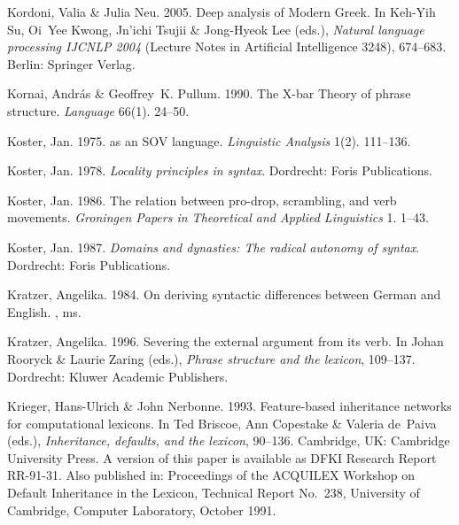 \begin{thebibliography}{1420}
Kordoni, Valia \& Julia Neu. 2005.
\newblock Deep analysis of {Modern Greek}.
\newblock In Keh-Yih Su, Oi~Yee Kwong, Jn'ichi Tsujii \& Jong-Hyeok Lee (eds.),
  \emph{Natural language processing {IJCNLP 2004}} (Lecture Notes in Artificial
  Intelligence 3248), 674--683. Berlin: Springer Verlag.

Kornai, Andr{\'a}s \& Geoffrey~K. Pullum. 1990.
\newblock The {X-bar Theory} of phrase structure.
\newblock \emph{Language} 66(1). 24--50.

Koster, Jan. 1975.
 as an {SOV} language.
\newblock \emph{Linguistic Analysis} 1(2). 111--136.

Koster, Jan. 1978.
\newblock \emph{Locality principles in syntax}.
\newblock Dordrecht: Foris Publications.

Koster, Jan. 1986.
\newblock The relation between pro-drop, scrambling, and verb movements.
\newblock \emph{Groningen Papers in Theoretical and Applied Linguistics} 1.
  1--43.

Koster, Jan. 1987.
\newblock \emph{Domains and dynasties: {The} radical autonomy of syntax}.
\newblock Dordrecht: Foris Publications.

Kratzer, Angelika. 1984.
\newblock On deriving syntactic differences between {German} and {English}.
, ms.

Kratzer, Angelika. 1996.
\newblock Severing the external argument from its verb.
\newblock In Johan Rooryck \& Laurie Zaring (eds.), \emph{Phrase structure and
  the lexicon}, 109--137. Dordrecht: Kluwer Academic Publishers.

Krieger, Hans-Ulrich \& John Nerbonne. 1993.
\newblock Feature-based inheritance networks for computational lexicons.
\newblock In Ted Briscoe, Ann Copestake \& Valeria de~Paiva (eds.),
  \emph{Inheritance, defaults, and the lexicon}, 90--136. Cambridge, UK:
  Cambridge University Press.
\newblock A version of this paper is available as DFKI Research Report
  RR-91-31. Also published in: {Proceedings} of the {ACQUILEX} Workshop on
  Default Inheritance in the Lexicon, Technical Report No.~238, University of
  Cambridge, Computer Laboratory, October 1991.


\end{thebibliography}
